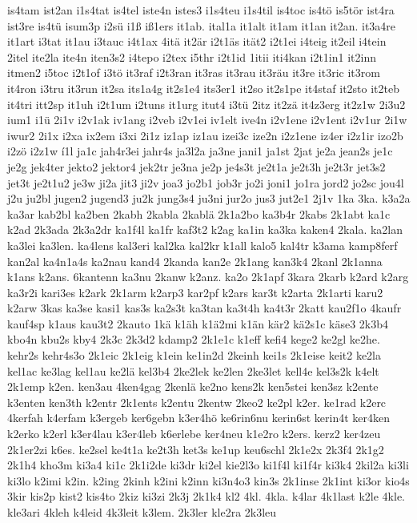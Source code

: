 {is4tam
ist2an
i1s4tat
is4tel
iste4n
istes3
i1s4teu
i1s4til
is4toc
is4tö
is5tör
ist4ra
ist3re
is4tü
isum3p
i2sü
i1ß
iß1ers
it1ab.
ital1a
it1alt
it1am
it1an
it2an.
it3a4re
it1art
i3tat
it1au
i3tauc
i4t1ax
4itä
it2är
i2t1äs
ität2
i2t1ei
i4teig
it2eil
i4tein
2itel
ite2la
ite4n
iten3s2
i4tepo
i2tex
i5thr
i2t1id
1itii
iti4kan
i2t1in1
it2inn
itmen2
i5toc
i2t1of
i3tö
it3raf
i2t3ran
it3ras
it3rau
it3räu
it3re
it3ric
it3rom
it4ron
i3tru
it3run
it2sa
its1a4g
it2s1e4
its3er1
it2so
it2s1pe
it4staf
it2sto
it2teb
it4tri
itt2sp
it1uh
i2t1um
i2tuns
it1urg
itut4
i3tü
2itz
it2zä
it4z3erg
it2z1w
2i3u2
ium1
i1ü
2i1v
i2v1ak
iv1ang
i2veb
i2v1ei
iv1elt
ive4n
i2v1ene
i2v1ent
i2v1ur
2i1w
iwur2
2i1x
i2xa
ix2em
i3xi
2i1z
iz1ap
iz1au
izei3c
ize2n
i2z1ene
iz4er
i2z1ir
izo2b
i2zö
i2z1w
í1l
ja1c
jah4r3ei
jahr4s
ja3l2a
ja3ne
jani1
ja1st
2jat
je2a
jean2s
je1c
je2g
jek4ter
jekto2
jektor4
jek2tr
je3na
je2p
je4s3t
je2t1a
je2t3h
je2t3r
jet3s2
jet3t
je2t1u2
je3w
ji2a
jit3
ji2v
joa3
jo2b1
job3r
jo2i
joni1
jo1ra
jord2
jo2sc
jou4l
j2u
ju2bl
jugen2
jugend3
ju2k
jung3s4
ju3ni
jur2o
jus3
jut2e1
2j1v
1ka
3ka.
k3a2a
ka3ar
kab2bl
ka2ben
2kabh
2kabla
2kablä
2k1a2bo
ka3b4r
2kabs
2k1abt
ka1c
k2ad
2k3ada
2k3a2dr
ka1f4l
ka1fr
kaf3t2
k2ag
ka1in
ka3ka
kaken4
2kala.
ka2lan
ka3lei
ka3len.
ka4lens
kal3eri
kal2ka
kal2kr
k1all
kalo5
kal4tr
k3ama
kamp8ferf
kan2al
ka4n1a4s
ka2nau
kand4
2kanda
kan2e
2k1ang
kan3k4
2kanl
2k1anna
k1ans
k2ans.
6kantenn
ka3nu
2kanw
k2anz.
ka2o
2k1apf
3kara
2karb
k2ard
k2arg
ka3r2i
kari3es
k2ark
2k1arm
k2arp3
kar2pf
k2ars
kar3t
k2arta
2k1arti
karu2
k2arw
3kas
ka3se
kasi1
kas3s
ka2s3t
ka3tan
ka3t4h
ka4t3r
2katt
kau2f1o
4kaufr
kauf4sp
k1aus
kau3t2
2kauto
1kä
k1äh
k1ä2mi
k1än
kär2
kä2s1c
käse3
2k3b4
kbo4n
kbu2s
kby4
2k3c
2k3d2
kdamp2
2k1e1c
k1eff
kefi4
kege2
ke2gl
ke2he.
kehr2s
kehr4s3o
2k1eic
2k1eig
k1ein
ke1in2d
2keinh
kei1s
2k1eise
keit2
ke2la
kel1ac
ke3lag
kel1au
ke2lä
kel3b4
2ke2lek
ke2len
2ke3let
kell4e
kel3s2k
k4elt
2k1emp
k2en.
ken3au
4ken4gag
2kenlä
ke2no
kens2k
ken5stei
ken3sz
k2ente
k3enten
ken3th
k2entr
2k1ents
k2entu
2kentw
2keo2
ke2pl
k2er.
ke1rad
k2erc
4kerfah
k4erfam
k3ergeb
ker6gebn
k3er4hö
ke6rin6nu
kerin6st
kerin4t
ker4ken
k2erko
k2erl
k3er4lau
k3er4leb
k6erlebe
ker4neu
k1e2ro
k2ers.
kerz2
ker4zeu
2k1er2zi
k6es.
ke2sel
ke4t1a
ke2t3h
ket3s
ke1up
keu6schl
2k1e2x
2k3f4
2k1g2
2k1h4
kho3m
ki3a4
ki1c
2k1i2de
ki3dr
ki2el
kie2l3o
ki1f4l
ki1f4r
ki3k4
2kil2a
ki3li
ki3lo
k2imi
k2in.
k2ing
2kinh
k2ini
k2inn
ki3n4o3
kin3s
2k1inse
2k1int
ki3or
kio4s
3kir
kis2p
kist2
kis4to
2kiz
ki3zi
2k3j
2k1k4
kl2
4kl.
4kla.
k4lar
4k1last
k2le
4kle.
kle3ari
4kleh
k4leid
4k3leit
k3lem.
2k3ler
kle2ra
2k3leu
}
